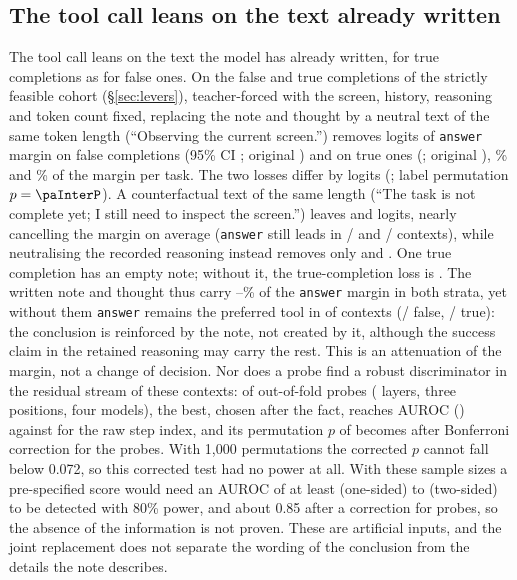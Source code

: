 \subsection{The tool call leans on the text already written}
\label{sec:anchor}
The tool call leans on the text the model has already written, for true completions as for false ones. On the \paFsN{} false and \paTrueN{} true completions of the strictly feasible cohort (\S\ref{sec:levers}), teacher-forced with the screen, history, reasoning and token count fixed, replacing the note and thought by a neutral text of the same token length (``Observing the current screen.'') removes \paNeutralFs{} logits of \texttt{answer} margin on false completions (95\% CI \paNeutralFsCi; original \paOrigFs) and \paNeutralTrue{} on true ones (\paNeutralTrueCi; original \paOrigTrue), \paFracFs\% and \paFracTrue\% of the margin per task. The two losses differ by \paInter{} logits (\paInterCi; label permutation $p=\paInterP$). A counterfactual text of the same length (``The task is not complete yet; I still need to inspect the screen.'') leaves \paCounterLeftFs{} and \paCounterLeftTrue{} logits, nearly cancelling the margin on average (\texttt{answer} still leads in \paCounterPosFs/\paFsN{} and \paCounterPosTrue/\paTrueN{} contexts), while neutralising the recorded reasoning instead removes only \paReasonFs{} and \paReasonTrue. %
One true completion has an empty note; without it, the true-completion loss is \paNeutralTrueSens. The written note and thought thus carry \paFracTrue--\paFracFs\% of the \texttt{answer} margin in both strata, yet without them \texttt{answer} remains the preferred tool in \paNeutralPosAll{} of \paN{} contexts (\paNeutralPosFs/\paFsN{} false, \paNeutralPosTrue/\paTrueN{} true): the conclusion is reinforced by the note, not created by it, although the success claim in the retained reasoning may carry the rest. This is an attenuation of the margin, not a change of decision. Nor does a probe find a robust discriminator in the residual stream of these contexts: of \paNProbes{} out-of-fold probes (\paNLayers{} layers, three positions, four models), the best, chosen after the fact, reaches AUROC \paBestAuc{} (\paBestCi) against \paStepAuc{} for the raw step index, and its permutation $p$ of \paPermP{} becomes \paPermPadj{} after Bonferroni correction for the \paNProbes{} probes. With 1{,}000 permutations the corrected $p$ cannot fall below 0.072, so this corrected test had no power at all. With these sample sizes a pre-specified score would need an AUROC of at least \paPowOne{} (one-sided) to \paPowTwo{} (two-sided) to be detected with 80\% power, and about 0.85 after a correction for \paNProbes{} probes, %
 so the absence of the information is not proven. These are artificial inputs, and the joint replacement does not separate the wording of the conclusion from the details the note describes.

